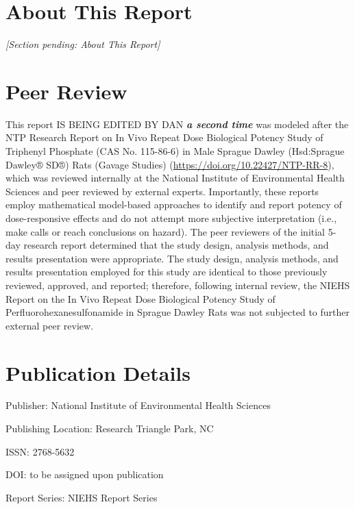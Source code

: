 \listoftables

\section{About This Report}

\emph{[Section pending: About This Report]}

\section{Peer Review}

This report IS BEING EDITED BY DAN \textbf{\textit{a second time}} was modeled after the NTP Research Report on In Vivo Repeat Dose Biological Potency Study of Triphenyl Phosphate (CAS No. 115-86-6) in Male Sprague Dawley (Hsd:Sprague Dawley® SD®) Rats (Gavage Studies) (\url{https://doi.org/10.22427/NTP-RR-8}), which was reviewed internally at the National Institute of Environmental Health Sciences and peer reviewed by external experts. Importantly, these reports employ mathematical model-based approaches to identify and report potency of dose-responsive effects and do not attempt more subjective interpretation (i.e., make calls or reach conclusions on hazard). The peer reviewers of the initial 5-day research report determined that the study design, analysis methods, and results presentation were appropriate. The study design, analysis methods, and results presentation employed for this study are identical to those previously reviewed, approved, and reported; therefore, following internal review, the NIEHS Report on the In Vivo Repeat Dose Biological Potency Study of Perfluorohexanesulfonamide in Sprague Dawley Rats was not subjected to further external peer review.

\section{Publication Details}

Publisher: National Institute of Environmental Health Sciences

Publishing Location: Research Triangle Park, NC

ISSN: 2768-5632

DOI: to be assigned upon publication

Report Series: NIEHS Report Series

